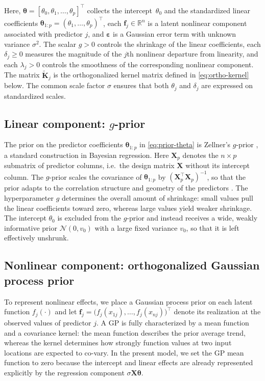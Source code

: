 \documentclass{article}
\begin{document}
Here, $\boldsymbol{\theta} = [\theta_0, \theta_1, \dots, \theta_p]^\top$ collects the intercept~$\theta_0$ and the standardized linear coefficients $\boldsymbol{\theta}_{1:p}=(\theta_1,\dots,\theta_p)^\top$,
each $\mathbf{f}_j\in\mathbb{R}^n$ is a latent nonlinear component
associated with predictor $j$, and $\boldsymbol{\varepsilon}$ is a
Gaussian error term with unknown variance $\sigma^2$.
The scalar $g>0$ controls the shrinkage of the linear coefficients,
each $\delta_j\ge 0$ measures the magnitude of the $j$th nonlinear
departure from linearity, and each $\lambda_j>0$ controls the smoothness
of the corresponding nonlinear component.
The matrix $\widetilde{\mathbf{K}}_j$ is the orthogonalized kernel
matrix defined in \eqref{eq:ortho-kernel} below.
The common scale factor $\sigma$ ensures that both
$\theta_j$ and $\delta_j$ are expressed on standardized scales.


\subsection{Linear component: \texorpdfstring{$g$}{g}-prior\label{subsec:linear}}

The prior on the predictor coefficients $\boldsymbol{\theta}_{1:p}$ in
\eqref{eq:prior-theta} is Zellner's $g$-prior
\parencite{Zellner1986}, a standard construction in Bayesian regression.
Here $\mathbf{X}_p$ denotes the $n\times p$ submatrix of predictor columns,
i.e.\ the design matrix $\mathbf{X}$ without its intercept column.
The $g$-prior scales the covariance of $\boldsymbol{\theta}_{1:p}$ by
$(\mathbf{X}_p^{\!\top}\mathbf{X}_p)^{-1}$, so that the prior adapts to
the correlation structure and geometry of the predictors
\parencite{Liang2008, Rouder2012}.
The hyperparameter $g$ determines the overall amount of shrinkage:
small values pull the linear coefficients toward zero, whereas large
values yield weaker shrinkage.
The intercept $\theta_0$ is excluded from the $g$-prior and instead
receives a wide, weakly informative prior $\mathcal{N}(0,v_0)$ with a
large fixed variance $v_0$, so that it is left effectively unshrunk.


\subsection{Nonlinear component: orthogonalized Gaussian process prior
\label{subsec:gp}}

To represent nonlinear effects, we place a Gaussian process prior
on each latent function $f_j(\cdot)$ and let
$\mathbf{f}_j = \bigl(f_j(x_{1j}),\dots,f_j(x_{nj})\bigr)^\top$
denote its realization at the observed values of predictor $j$.
A GP is fully characterized by a mean function and a covariance kernel:
the mean function describes the prior average trend, whereas the kernel
determines how strongly function values at two input locations are
expected to co-vary.
In the present model, we set the GP mean function to zero because the
intercept and linear effects are already represented explicitly by the
regression component $\sigma\mathbf{X}\boldsymbol{\theta}$.
\end{document}
